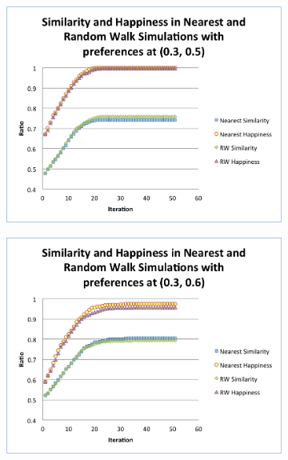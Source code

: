 \documentclass[11pt,twoside]{amsart}
\theoremstyle{theorem}
\theoremstyle{definition}
\theoremstyle{remark}
\begin{document}
    \begin{figure}
        \begin{subfigure}[b]{0.3\textwidth}
            \includegraphics[scale=0.35]{3_5.png}
        \end{subfigure}

        \begin{subfigure}[b]{0.3\textwidth}
            \includegraphics[scale=0.35]{3_6.png}
        \end{subfigure}
    \end{figure}
\end{document}
